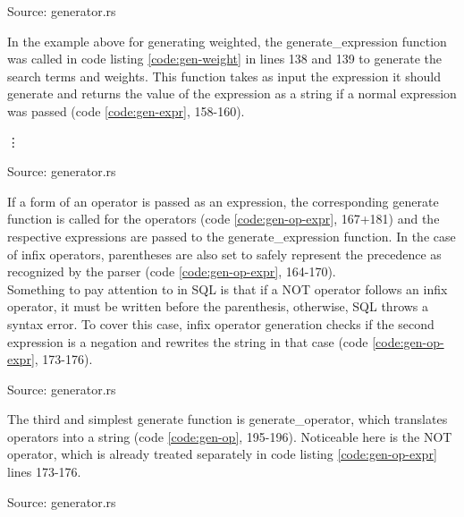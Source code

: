 \begin{codeenv}
    \label{code:gen-in-stat}
    
    \centerline{Source: generator.rs}
\end{codeenv}
In the example above for generating weighted, the generate\_expression function was called in code listing \ref{code:gen-weight} in lines 138 and 139 to generate the search terms and weights. This function takes as input the expression it should generate and returns the value of the expression as a string if a normal expression was passed (code \ref{code:gen-expr}, 158-160).
\begin{codeenv}
    \label{code:gen-expr}
    
    \vdots
    
    \centerline{Source: generator.rs}
\end{codeenv}
If a form of an operator is passed as an expression, the corresponding generate function is called for the operators (code \ref{code:gen-op-expr}, 167+181) and the respective expressions are passed to the generate\_expression function. In the case of infix operators, parentheses are also set to safely represent the precedence as recognized by the parser (code \ref{code:gen-op-expr}, 164-170).\\
Something to pay attention to in \ac{SQL} is that if a NOT operator follows an infix operator, it must be written before the parenthesis, otherwise, \ac{SQL} throws a syntax error. To cover this case, infix operator generation checks if the second expression is a negation and rewrites the string in that case (code \ref{code:gen-op-expr}, 173-176).
\begin{codeenv}
    \label{code:gen-op-expr}
    
    \centerline{Source: generator.rs}
\end{codeenv}
The third and simplest generate function is generate\_operator, which translates operators into a string (code \ref{code:gen-op}, 195-196). Noticeable here is the NOT operator, which is already treated separately in code listing \ref{code:gen-op-expr} lines 173-176.
\begin{codeenv}
    \label{code:gen-op}
    
    \centerline{Source: generator.rs}
\end{codeenv}
